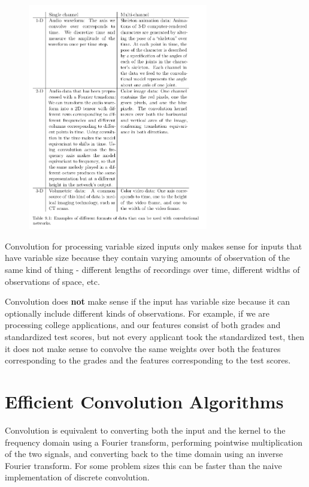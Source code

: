 \documentclass[onecolumn, letterpaper, 12pt]{report}
\begin{document}
\begin{figure}[h]
  \centering
  \includegraphics[width=0.7\textwidth]{conv_data.png}
\end{figure}

Convolution for processing variable sized inputs only makes sense for inputs that have variable size because they contain varying amounts of observation of the same kind of thing - different lengths of recordings over time, different widths of observations of space, etc. 

Convolution does \textbf{not} make sense if the input has variable size because it can optionally include different kinds of observations. For example, if we are processing college applications, and our features consist of both grades and standardized test scores, but not every applicant took the standardized test, then it does not make sense to convolve the same weights over both the features corresponding to the grades and the features corresponding to the test scores. 

\section{Efficient Convolution Algorithms}

Convolution is equivalent to converting both the input and the kernel to the frequency domain using a Fourier transform, performing pointwise multiplication of the two signals, and converting back to the time domain using an inverse Fourier transform. For some problem sizes this can be faster than the naive implementation of discrete convolution.
\end{document}
